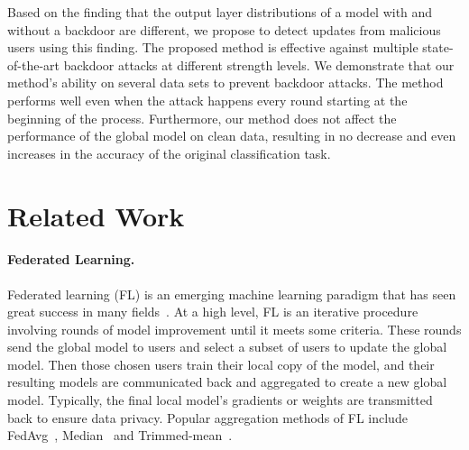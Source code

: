 \documentclass{article} %
\newcommand{\yli}[1]{{\color{cyan}#1}}
\begin{document}
\yli{Based on the finding that the output layer distributions of a model with and without a backdoor are different, we propose to detect updates from malicious users using this finding. The proposed method is effective against multiple state-of-the-art backdoor attacks at different strength levels.}
We demonstrate that our method's ability on several data sets to prevent backdoor attacks. 
\yli{The method performs well even when the attack happens every round starting at the beginning of the process.}
\yli{Furthermore, our method does not affect the performance of the global model on clean data, resulting in no decrease and even increases in the accuracy of the original classification task.}


\vspace{-10pt}
\section{Related Work}
\vspace{-5pt}

\paragraph{Federated Learning.} Federated learning (FL) is an emerging machine learning paradigm that has seen great success in many fields~\citep{ryffel2018generic,hard2018federated,bonawitz2019towards}.
At a high level, FL is an iterative procedure involving rounds of model improvement until it meets some criteria. These rounds send the global model to users and select a subset of users to update the global model. Then those chosen users train their local copy of the model, and their resulting models are communicated back and aggregated to create a new global model. Typically, the final local model's gradients or weights are transmitted back to ensure data privacy. \yli{Popular aggregation methods of FL include FedAvg~\citep{fedavg}, Median~\citep{yin2018byzantine} and Trimmed-mean~\citep{yin2018byzantine}.}

\vspace{-10pt}
\end{document}
